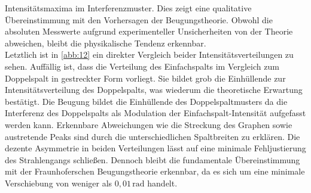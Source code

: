 Intensitätsmaxima im Interferenzmuster. Dies zeigt eine qualitative
Übereinstimmung mit den Vorhersagen der Beugungstheorie. Obwohl die absoluten 
Messwerte aufgrund experimenteller Unsicherheiten von der Theorie abweichen,
bleibt die physikalische Tendenz erkennbar.
\\
\noindent Letztlich ist in \autoref{abb:12} ein direkter Vergleich beider 
Intensitätsverteilungen zu sehen. Auffällig ist, dass die Verteilung des 
Einfachspalts im Vergleich zum Doppelspalt in gestreckter Form vorliegt. Sie 
bildet grob die Einhüllende zur Intensitätsverteilung des Doppelspalts, 
was wiederum die theoretische Erwartung bestätigt. Die Beugung bildet die 
Einhüllende des Doppelspaltmusters da die Interferenz des Doppelspalts als 
Modulation der Einfachspalt-Intensität aufgefasst werden kann. Erkennbare 
Abweichungen wie die Streckung des Graphen sowie austretende Peaks sind durch 
die unterschiedlichen Spaltbreiten zu erklären. Die dezente Asymmetrie in beiden
Verteilungen lässt auf eine minimale Fehljustierung des Strahlengangs schließen.
Dennoch bleibt die fundamentale Übereinstimmung mit der Fraunhoferschen
Beugungstheorie erkennbar, da es sich um eine minimale Verschiebung von weniger 
als $0,01\,\text{rad}$ handelt.